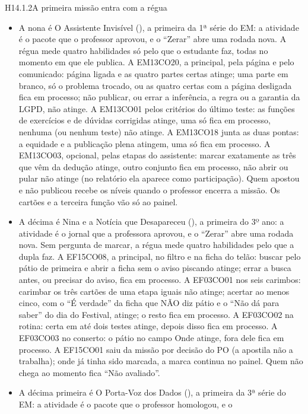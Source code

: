 \begin{historia}{H14.1.2}{A primeira missão entra com a régua}{\pronto}
\begin{itemize}
    painel.
  \item A nona é O Assistente Invisível (), a primeira da 1ª
    série do EM: a atividade é o pacote que o professor aprovou, e o
    \enquote{Zerar} abre uma rodada nova. A régua mede quatro habilidades só
    pelo que o estudante faz, todas no momento em que ele publica. A
    EM13CO20, a principal, pela página e pelo comunicado: página ligada e as
    quatro partes certas atinge; uma parte em branco, só o problema trocado,
    ou as quatro certas com a página desligada fica em processo; não
    publicar, ou errar a inferência, a regra ou a garantia da LGPD, não
    atinge. A EM13CO01 pelos critérios do último teste: as funções de
    exercícios e de dúvidas corrigidas atinge, uma só fica em processo,
    nenhuma (ou nenhum teste) não atinge. A EM13CO18 junta as duas pontas: a
    equidade e a publicação plena atingem, uma só fica em processo. A
    EM13CO03, opcional, pelas etapas do assistente: marcar exatamente as três
    que vêm da dedução atinge, outro conjunto fica em processo, não abrir ou
    pular não atinge (no relatório ela aparece como participação). Quem
    apostou e não publicou recebe os níveis quando o professor encerra a
    missão. Os cartões e a terceira função vão só ao painel.
  \item A décima é Nina e a Notícia que Desapareceu (), a
    primeira do 3º ano: a atividade é o jornal que a professora aprovou, e o
    \enquote{Zerar} abre uma rodada nova. Sem pergunta de marcar, a régua
    mede quatro habilidades pelo que a dupla faz. A EF15CO08, a principal, no
    filtro e na ficha do telão: buscar pelo pátio de primeira e abrir a ficha
    sem o aviso piscando atinge; errar a busca antes, ou precisar do aviso,
    fica em processo. A EF03CO01 nos seis carimbos: carimbar os três cartões
    de uma etapa iguais não atinge; acertar ao menos cinco, com o
    \enquote{É verdade} da ficha que NÃO diz pátio e o \enquote{Não dá para
    saber} do dia do Festival, atinge; o resto fica em processo. A EF03CO02 na
    rotina: certa em até dois testes atinge, depois disso fica em processo. A
    EF03CO03 no conserto: o pátio no campo Onde atinge, fora dele fica em
    processo. A EF15CO01 saiu da missão por decisão do PO (a apostila não a
    trabalha); onde já tinha sido marcada, a marca continua no painel. Quem não
    chega ao momento fica \enquote{Não avaliado}.
  \item A décima primeira é O Porta-Voz dos Dados (), a primeira da 3ª
    série do EM: a atividade é o pacote que o professor homologou, e o

\end{itemize}
\end{historia}
